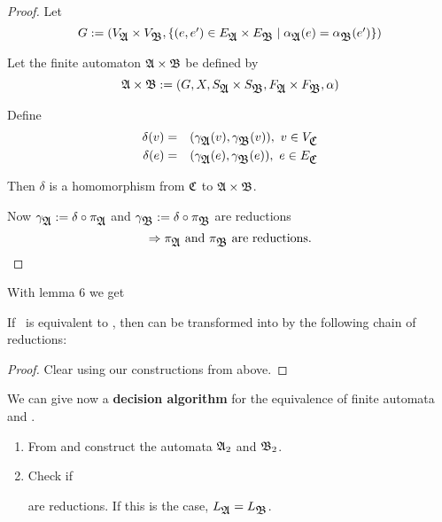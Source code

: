 \begin{proof}
Let \[ G := (V_{\mbox{$\mathfrak{A}$}} \times V_{\mbox{$\mathfrak{B}$}}, \mbox{$\{(e, e') \in E_{\mbox{$\mathfrak{A}$}} \times
E_{\mbox{$\mathfrak{B}$}} \mid \alpha_{\mbox{$\mathfrak{A}$}}(e) = \alpha_{\mbox{$\mathfrak{B}$}}(e')\}$}  ) \]

Let the finite automaton $\mbox{$\mathfrak{A}$} \times \mbox{$\mathfrak{B}$}$ be defined by
\[ \mbox{$\mathfrak{A}$} \times \mbox{$\mathfrak{B}$} := (G, X, S_{\mbox{$\mathfrak{A}$}} \times S_{\mbox{$\mathfrak{B}$}}, F_{\mbox{$\mathfrak{A}$}}
\times F_{\mbox{$\mathfrak{B}$}}, \alpha) \]

Define
\begin{eqnarray*}
\delta(v) &=& (\gamma_{\mbox{$\mathfrak{A}$}}(v), \gamma_{\mbox{$\mathfrak{B}$}}(v)),\ v \in V_{\mbox{$\mathfrak{C}$}} \\
\delta(e) &=& (\gamma_{\mbox{$\mathfrak{A}$}}(e), \gamma_{\mbox{$\mathfrak{B}$}}(e)),\ e \in E_{\mbox{$\mathfrak{C}$}}
\end{eqnarray*}

Then $\delta$ is a homomorphism from $\mbox{$\mathfrak{C}$}$ to $\mbox{$\mathfrak{A}$} \times \mbox{$\mathfrak{B}$}$.

Now $\gamma_{\mbox{$\mathfrak{A}$}} := \delta \circ \pi_{\mbox{$\mathfrak{A}$}}$ and $\gamma_{\mbox{$\mathfrak{B}$}} :=
\delta \circ \pi_{\mbox{$\mathfrak{B}$}}$ are reductions
\[ \Rightarrow \pi_{\mbox{$\mathfrak{A}$}} \text{ and } \pi_{\mbox{$\mathfrak{B}$}} \text{ are reductions.} \]
\end{proof}

With lemma 6 we get

\begin{theorem}
If\  is equivalent to , then  can be transformed into 
by the following chain of reductions:
\begin{center}
\end{center}
\end{theorem}

\begin{proof}
Clear using our constructions from above.
\end{proof}

\bigskip
We can give now a {\bf decision algorithm} for the equivalence of finite
automata  and .

\begin{enumerate}
  \item From  and  construct the automata $\mbox{$\mathfrak{A}$}_2$ and $\mbox{$\mathfrak{B}$}_2$.
  \item Check if 
	are reductions. If this is the case, $L_{\mbox{$\mathfrak{A}$}} = L_{\mbox{$\mathfrak{B}$}}$.
\end{enumerate}

